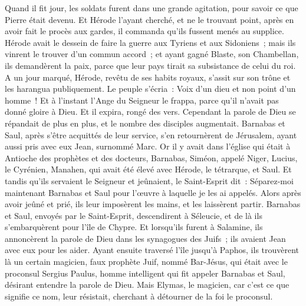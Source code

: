 \begin{multicols}{2}
Quand il fit jour, les soldats furent dans une grande agitation, pour savoir ce que Pierre était devenu.
Et Hérode l'ayant cherché, et ne le trouvant point, après en avoir fait le procès aux gardes, il commanda qu'ils fussent menés au supplice.
Hérode avait le dessein de faire la guerre aux Tyriens et aux Sidoniens~; mais ils vinrent le trouver d'un commun accord~; et ayant gagné Blaste, son Chambellan, ils demandèrent la paix, parce que leur pays tirait sa subsistance de celui du roi.
A un jour marqué, Hérode, revêtu de ses habits royaux, s'assit sur son trône et les harangua publiquement.
Le peuple s'écria~: Voix d'un dieu et non point d'un homme~!
Et à l'instant l'Ange du Seigneur le frappa, parce qu'il n'avait pas donné gloire à Dieu. Et il expira, rongé des vers.
Cependant la parole de Dieu se répandait de plus en plus, et le nombre des disciples augmentait.
Barnabas et Saul, après s'être acquittés de leur service, s'en retournèrent de Jérusalem, ayant aussi pris avec eux Jean, surnommé Marc.
\VerseOne{}Or il y avait dans l'église qui était à Antioche des prophètes et des docteurs, Barnabas, Siméon, appelé Niger, Lucius, le Cyrénien, Manahen, qui avait été élevé avec Hérode, le tétrarque, et Saul.
Et tandis qu'ils servaient le Seigneur et jeûnaient, le Saint-Esprit dit~: Séparez-moi maintenant Barnabas et Saul pour l'œuvre à laquelle je les ai appelés.
Alors après avoir jeûné et prié, ils leur imposèrent les mains, et les laissèrent partir.
Barnabas et Saul, envoyés par le Saint-Esprit, descendirent à Séleucie, et de là ils s'embarquèrent pour l'île de Chypre.
Et lorsqu'ils furent à Salamine, ils annoncèrent la parole de Dieu dans les synagogues des Juifs~; ils avaient Jean avec eux pour les aider.
Ayant ensuite traversé l'île jusqu'à Paphos, ils trouvèrent là un certain magicien, faux prophète Juif, nommé Bar-Jésus,
qui était avec le proconsul Sergius Paulus, homme intelligent qui fit appeler Barnabas et Saul, désirant entendre la parole de Dieu.
Mais Elymas, le magicien, car c'est ce que signifie ce nom, leur résistait, cherchant à détourner de la foi le proconsul.

\end{multicols}
